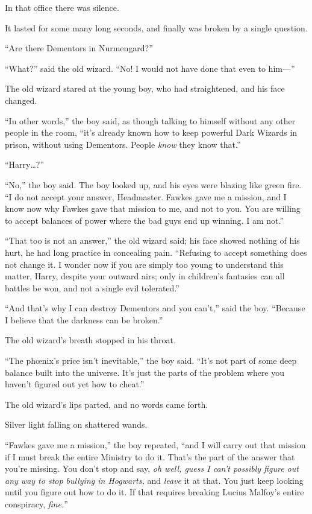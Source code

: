 In that office there was silence.

It lasted for some many long seconds, and finally was broken by a single question.

“Are there Dementors in Nurmengard?”

“What?” said the old wizard. “No! I would not have done that even to him—”

\later

The old wizard stared at the young boy, who had straightened, and his face changed.

“In other words,” the boy said, as though talking to himself without any other people in the room, “it’s already known how to keep powerful Dark Wizards in prison, without using Dementors. People \emph{know} they know that.”

“Harry…?”

“No,” the boy said. The boy looked up, and his eyes were blazing like green fire. “I do not accept your answer, Headmaster. Fawkes gave me a mission, and I know now why Fawkes gave that mission to me, and not to you. You are willing to accept balances of power where the bad guys end up winning. I am not.”

“That too is not an answer,” the old wizard said; his face showed nothing of his hurt, he had long practice in concealing pain. “Refusing to accept something does not change it. I wonder now if you are simply too young to understand this matter, Harry, despite your outward airs; only in children’s fantasies can all battles be won, and not a single evil tolerated.”

“And that’s why I can destroy Dementors and you can’t,” said the boy. “Because I believe that the darkness can be broken.”

The old wizard’s breath stopped in his throat.

“The phœnix’s price isn’t inevitable,” the boy said. “It’s not part of some deep balance built into the universe. It’s just the parts of the problem where you haven’t figured out yet how to cheat.”

The old wizard’s lips parted, and no words came forth.

Silver light falling on shattered wands.

“Fawkes gave me a mission,” the boy repeated, “and I will carry out that mission if I must break the entire Ministry to do it. That’s the part of the answer that you’re missing. You don’t stop and say, \emph{oh well, guess I can’t possibly figure out any way to stop bullying in Hogwarts,} and \emph{leave} it at that. You just keep looking until you figure out how to do it. If that requires breaking Lucius Malfoy’s entire conspiracy, \emph{fine.}”

